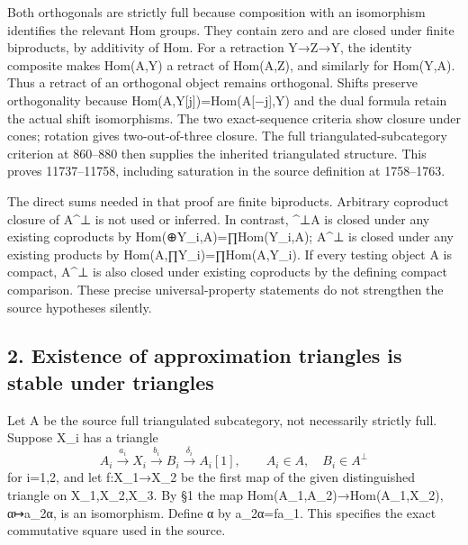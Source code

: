 \documentclass[11pt]{article}
\begin{document}
Both orthogonals are strictly full because composition with an isomorphism identifies the relevant Hom groups. They contain zero and are closed under finite biproducts,\allowbreak{} by additivity of Hom. For a retraction Y\allowbreak{}→Z\allowbreak{}→Y,\allowbreak{} the identity composite makes Hom(A,\allowbreak{}Y)\allowbreak{} a retract of Hom(A,\allowbreak{}Z)\allowbreak{},\allowbreak{} and similarly for Hom(Y,\allowbreak{}A)\allowbreak{}. Thus a retract of an orthogonal object remains orthogonal. Shifts preserve orthogonality because Hom(A,\allowbreak{}Y[j]\allowbreak{})\allowbreak{}\allowbreak{}=Hom(A[−j]\allowbreak{},\allowbreak{}Y)\allowbreak{} and the dual formula retain the actual shift isomorphisms. The two exact-sequence criteria show closure under cones; rotation gives two-out-of-three closure. The full triangulated-subcategory criterion at 860–\allowbreak{}880 then supplies the inherited triangulated structure. This proves 11737–\allowbreak{}11758,\allowbreak{} including saturation in the source definition at 1758–\allowbreak{}1763.

The direct sums needed in that proof are finite biproducts. Arbitrary coproduct closure of A\^{}⊥ is not used or inferred. In contrast,\allowbreak{} \^{}⊥A is closed under any existing coproducts by Hom(\allowbreak{}⊕Y\_\allowbreak{}i,\allowbreak{}A)\allowbreak{}\allowbreak{}=∏Hom(Y\_\allowbreak{}i,\allowbreak{}A)\allowbreak{}; A\^{}⊥ is closed under any existing products by Hom(A,\allowbreak{}∏Y\_\allowbreak{}i)\allowbreak{}\allowbreak{}=∏Hom(A,\allowbreak{}Y\_\allowbreak{}i)\allowbreak{}. If every testing object A is compact,\allowbreak{} A\^{}⊥ is also closed under existing coproducts by the defining compact comparison. These precise universal-property statements do not strengthen the source hypotheses silently.

\subsection{2. Existence of approximation triangles is stable under triangles}\label{proofs-11665-12003-existence-of-approximation-triangles-is-stable-under-triangles}

Let A be the source full triangulated subcategory,\allowbreak{} not necessarily strictly full. Suppose X\_\allowbreak{}i has a triangle \[
 A_i\xrightarrow{a_i}X_i\xrightarrow{b_i}B_i
 \xrightarrow{\delta_i}A_i[1],\qquad A_i\in A,\quad B_i\in A^\perp
\] for i\allowbreak{}=1,\allowbreak{}2,\allowbreak{} and let f:\allowbreak{}X\_\allowbreak{}1\allowbreak{}→X\_\allowbreak{}2 be the first map of the given distinguished triangle on X\_\allowbreak{}1,\allowbreak{}X\_\allowbreak{}2,\allowbreak{}X\_\allowbreak{}3. By §1 the map Hom(A\_\allowbreak{}1,\allowbreak{}A\_\allowbreak{}2)\allowbreak{}\allowbreak{}→Hom(A\_\allowbreak{}1,\allowbreak{}X\_\allowbreak{}2)\allowbreak{},\allowbreak{} α\allowbreak{}↦a\_\allowbreak{}2α,\allowbreak{} is an isomorphism. Define α by a\_\allowbreak{}2α\allowbreak{}=fa\_\allowbreak{}1. This specifies the exact commutative square used in the source.
\end{document}
